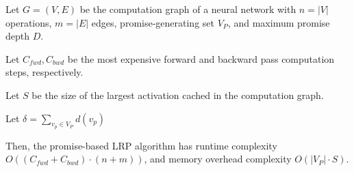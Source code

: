 \documentclass{article}
\begin{document}
\vspace{0.3cm}
\begin{theorem}
Let $G = (V, E)$ be the computation graph of a neural network with $n = |V|$ operations, $m = |E|$ edges, promise-generating set $V_P$, and maximum promise depth $D$.

Let $C_{fwd}, C_{bwd}$ be the most expensive forward and backward pass computation steps, respectively.

Let $S$ be the size of the largest activation cached in the computation graph.

Let $\delta = \sum_{v_p \in V_P} d(v_p)$

Then, the promise-based LRP algorithm has runtime complexity $O((C_{fwd} + C_{bwd}) \cdot (n + m))$, and memory overhead complexity $O(|V_P| \cdot S)$.
\end{theorem}
\end{document}
